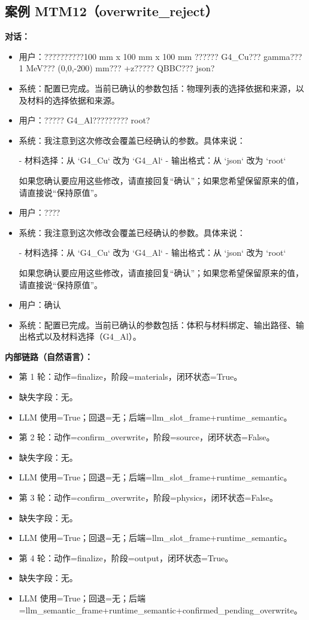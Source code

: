 \documentclass[11pt]{ctexart}
\begin{document}
\subsection{案例 MTM12（overwrite\_reject）}
\textbf{对话：}
\begin{itemize}
\item 用户：??????????100 mm x 100 mm x 100 mm ?????? G4\_Cu??? gamma??? 1 MeV??? (0,0,-200) mm??? +z????? QBBC??? json?
\item 系统：配置已完成。当前已确认的参数包括：物理列表的选择依据和来源，以及材料的选择依据和来源。
\item 用户：????? G4\_Al????????? root?
\item 系统：我注意到这次修改会覆盖已经确认的参数。具体来说：

- 材料选择：从 `G4\_Cu` 改为 `G4\_Al`
- 输出格式：从 `json` 改为 `root`

如果您确认要应用这些修改，请直接回复“确认”；如果您希望保留原来的值，请直接说“保持原值”。
\item 用户：????
\item 系统：我注意到这次修改会覆盖已经确认的参数。具体来说：

- 材料选择：从 `G4\_Cu` 改为 `G4\_Al`
- 输出格式：从 `json` 改为 `root`

如果您确认要应用这些修改，请直接回复“确认”；如果您希望保留原来的值，请直接说“保持原值”。
\item 用户：确认
\item 系统：配置已完成。当前已确认的参数包括：体积与材料绑定、输出路径、输出格式以及材料选择（G4\_Al）。
\end{itemize}
\textbf{内部链路（自然语言）：}
\begin{itemize}
\item 第 1 轮：动作=finalize，阶段=materials，闭环状态=True。
\item 缺失字段：无。
\item LLM 使用=True；回退=无；后端=llm\_slot\_frame+runtime\_semantic。
\item 第 2 轮：动作=confirm\_overwrite，阶段=source，闭环状态=False。
\item 缺失字段：无。
\item LLM 使用=True；回退=无；后端=llm\_slot\_frame+runtime\_semantic。
\item 第 3 轮：动作=confirm\_overwrite，阶段=physics，闭环状态=False。
\item 缺失字段：无。
\item LLM 使用=True；回退=无；后端=llm\_slot\_frame+runtime\_semantic。
\item 第 4 轮：动作=finalize，阶段=output，闭环状态=True。
\item 缺失字段：无。
\item LLM 使用=True；回退=无；后端=llm\_semantic\_frame+runtime\_semantic+confirmed\_pending\_overwrite。
\end{itemize}
\end{document}

